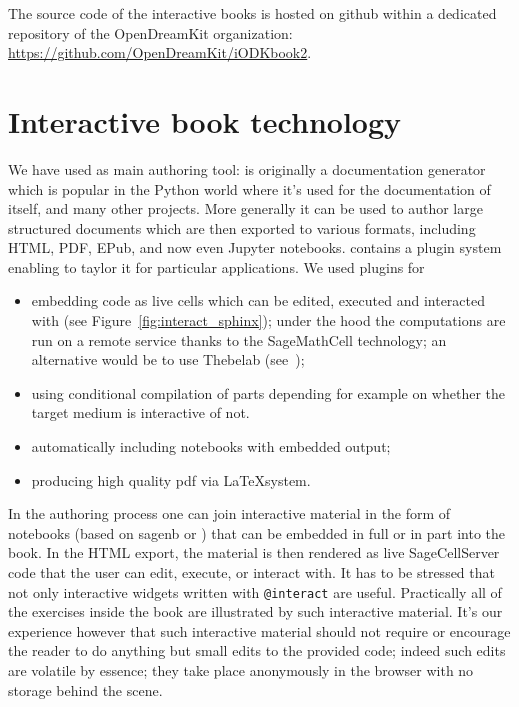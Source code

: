 \documentclass{deliverablereport}
\begin{document}
The source code of the interactive books is hosted on github within a
dedicated repository of the OpenDreamKit organization:
\url{https://github.com/OpenDreamKit/iODKbook2}.


\section{Interactive book technology}

We have used \Sphinx as main authoring tool: \Sphinx is originally a
documentation generator which is popular in the Python world where
it's used for the documentation of \Python itself, and many other
projects. More generally it can be used to author large structured
documents which are then exported to various formats, including HTML,
PDF, EPub, and now even Jupyter notebooks. \Sphinx contains a plugin
system enabling to taylor it for particular applications. We used
plugins for
\begin{itemize}
\item embedding \Sage code as live cells which can be edited, executed
  and interacted with (see Figure~\ref{fig:interact_sphinx}); under
  the hood the computations are run on a remote service thanks to the
  SageMathCell technology; an alternative would be to use Thebelab
  (see~);
\item using conditional compilation of parts depending for example on
  whether the target medium is interactive of not.
\item automatically including \Jupyter notebooks with embedded output;
\item producing high quality pdf via \LaTeX system.
\end{itemize}

In the authoring process one can join interactive material in the form
of notebooks (based on sagenb or \Jupyter) that can be embedded in
full or in part into the \Sphinx book. In the HTML export, the
material is then rendered as live SageCellServer code that the user
can edit, execute, or interact with. It has to be stressed that not
only interactive widgets written with \texttt{@interact} are useful.
Practically all of the  exercises inside the book are
illustrated by such interactive material. It's our experience however
that such interactive material should not require or encourage the
reader to do anything but small edits to the provided code; indeed
such edits are volatile by essence; they take place anonymously in the
browser with no storage behind the scene.
\end{document}
